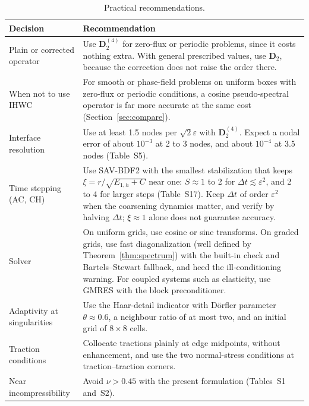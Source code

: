 \documentclass[preprint,12pt]{elsarticle}
\theoremstyle{remark}
\begin{document}
\begin{table}[t]\centering\small
\caption{Practical recommendations.}\label{tab:guide}
\begin{tabular}{>{\raggedright\arraybackslash}p{}>{\raggedright\arraybackslash}p{}}
\toprule
Decision & Recommendation\\
\midrule
Plain or corrected operator & Use $\mathbf D_2^{(4)}$ for zero-flux or periodic problems, since it costs nothing extra. With general prescribed values, use $\mathbf D_2$, because the correction does not raise the order there.\\
When not to use IHWC & For smooth or phase-field problems on uniform boxes with zero-flux or periodic conditions, a cosine pseudo-spectral operator is far more accurate at the same cost (Section~\ref{sec:compare}).\\
Interface resolution & Use at least 1.5 nodes per $\sqrt2\varepsilon$ with $\mathbf D_2^{(4)}$. Expect a nodal error of about $10^{-3}$ at 2 to 3 nodes, and about $10^{-4}$ at 3.5 nodes (Table~S5).\\
Time stepping (AC, CH) & Use SAV-BDF2 with the smallest stabilization that keeps $\xi=r/\sqrt{E_{1,h}+C}$ near one: $S\approx1$ to 2 for $\Delta t\lesssim\varepsilon^2$, and 2 to 4 for larger steps (Table~S17). Keep $\Delta t$ of order $\varepsilon^2$ when the coarsening dynamics matter, and verify by halving $\Delta t$; $\xi\approx1$ alone does not guarantee accuracy.\\
Solver & On uniform grids, use cosine or sine transforms. On graded grids, use fast diagonalization (well defined by Theorem~\ref{thm:spectrum}) with the built-in check and Bartels--Stewart fallback, and heed the ill-conditioning warning. For coupled systems such as elasticity, use GMRES with the block preconditioner.\\
Adaptivity at singularities & Use the Haar-detail indicator with D\"orfler parameter $\theta\approx0.6$, a neighbour ratio of at most two, and an initial grid of $8\times8$ cells.\\
Traction conditions & Collocate tractions plainly at edge midpoints, without enhancement, and use the two normal-stress conditions at traction--traction corners.\\
Near incompressibility & Avoid $\nu>0.45$ with the present formulation (Tables~S1 and~S2).\\
\bottomrule
\end{tabular}
\end{table}
\end{document}
